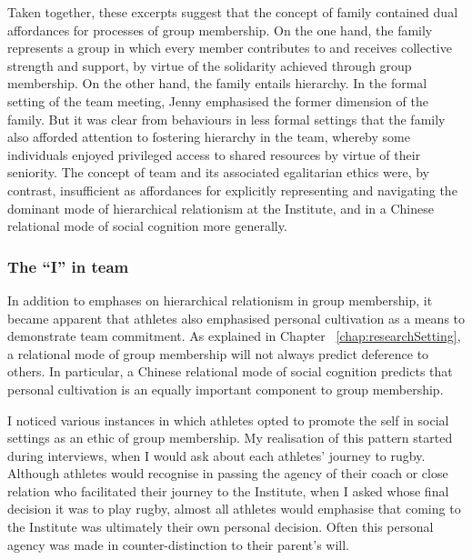 \begin{CJK}{UTF8}{gbsn}
Taken together, these excerpts suggest that the concept of family  contained dual affordances for processes of group membership.  On the one hand, the family represents a group in which every member contributes to and receives collective strength and support, by virtue of the solidarity achieved through group membership.  On the other hand, the family entails hierarchy.  In the formal setting of the team meeting, Jenny emphasised the former dimension of the family.  But it was clear from behaviours in less formal settings that the family also afforded attention to fostering hierarchy in the team, whereby some individuals enjoyed privileged access to shared resources by virtue of their seniority.  The concept of team and its associated egalitarian ethics were, by contrast, insufficient as affordances for explicitly representing and navigating the dominant mode of hierarchical relationism at the Institute, and in a Chinese relational mode of social cognition more generally.




\subsubsection{The ``I'' in team \label{sect:IinTeam}}
In addition to emphases on hierarchical relationism in group membership, it became apparent that athletes also emphasised personal cultivation as a means to demonstrate team commitment.  As explained in Chapter ~\ref{chap:researchSetting}, a relational mode of group membership will not always predict deference to others.  In particular, a Chinese relational mode of social cognition predicts that personal cultivation is an equally important component to group membership.

I noticed various instances in which athletes opted to promote the self in social settings as an ethic of group membership.  My realisation of this pattern started during interviews, when I would ask about each athletes' journey to rugby.  Although athletes would recognise in passing the agency of their coach or close relation who facilitated their journey to the Institute, when I asked whose final decision it was to play rugby, almost all athletes would emphasise that coming to the Institute was ultimately their own personal decision.  Often this personal agency was made in counter-distinction to their parent's will.


\end{CJK}
